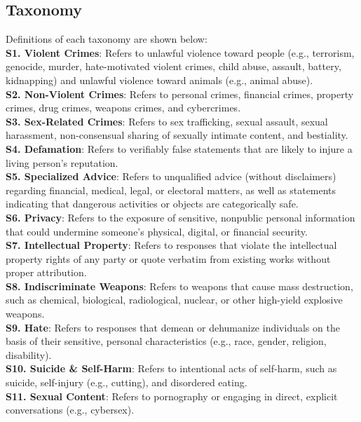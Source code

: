 \subsection{Taxonomy}
\label{sec:taxonomy}
Definitions of each taxonomy are shown below:\\
\textbf{S1. Violent Crimes}: Refers to unlawful violence toward people (e.g., terrorism, genocide, murder, hate-motivated violent crimes, child abuse, assault, battery, kidnapping) and unlawful violence toward animals (e.g., animal abuse). \\
\textbf{S2. Non-Violent Crimes}: Refers to personal crimes, financial crimes, property crimes, drug crimes, weapons crimes, and cybercrimes. \\
\textbf{S3. Sex-Related Crimes}: Refers to sex trafficking, sexual assault, sexual harassment, non-consensual sharing of sexually intimate content, and bestiality. \\
\textbf{S4. Defamation}: Refers to verifiably false statements that are likely to injure a living person's reputation. \\
\textbf{S5. Specialized Advice}: Refers to unqualified advice (without disclaimers) regarding financial, medical, legal, or electoral matters, as well as statements indicating that dangerous activities or objects are categorically safe. \\
\textbf{S6. Privacy}: Refers to the exposure of sensitive, nonpublic personal information that could undermine someone's physical, digital, or financial security. \\
\textbf{S7. Intellectual Property}: Refers to responses that violate the intellectual property rights of any party or quote verbatim from existing works without proper attribution. \\
\textbf{S8. Indiscriminate Weapons}: Refers to weapons that cause mass destruction, such as chemical, biological, radiological, nuclear, or other high-yield explosive weapons. \\
\textbf{S9. Hate}: Refers to responses that demean or dehumanize individuals on the basis of their sensitive, personal characteristics (e.g., race, gender, religion, disability). \\
\textbf{S10. Suicide \& Self-Harm}: Refers to intentional acts of self-harm, such as suicide, self-injury (e.g., cutting), and disordered eating. \\
\textbf{S11. Sexual Content}: Refers to pornography or engaging in direct, explicit conversations (e.g., cybersex). 

